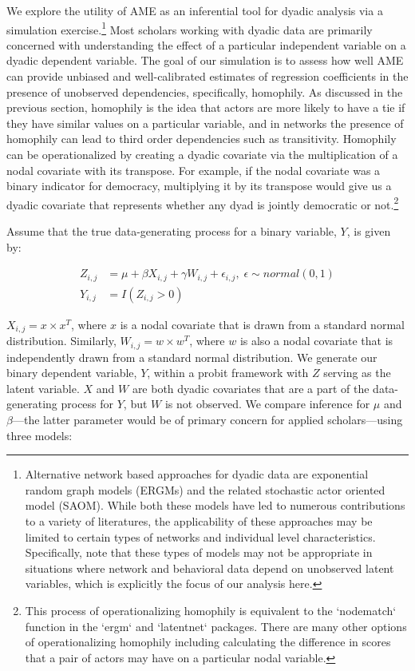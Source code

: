 \documentclass[12pt]{amsart}
\begin{document}
We explore the utility of AME as an inferential tool for dyadic analysis via a simulation exercise.\footnote{Alternative network based approaches for dyadic data are exponential random graph models (ERGMs) and the related stochastic actor oriented model (SAOM). While both these models have led to numerous contributions to a variety of literatures, the applicability of these approaches may be limited to certain types of networks and individual level characteristics. Specifically, \citet{block:etal:2017} note that these types of  models may not be appropriate in situations where network and behavioral data depend on unobserved latent variables, which is explicitly the focus of our analysis here.} Most scholars working with dyadic data are primarily concerned with understanding the effect of a particular independent variable on a dyadic dependent variable. The goal of our simulation is to assess how well AME can provide unbiased and well-calibrated estimates of regression coefficients in the presence of unobserved dependencies, specifically, homophily. As discussed in the previous section, homophily is the idea that actors are more likely to have a tie if they have similar values on a particular variable, and in networks the presence of homophily can lead to third order dependencies such as transitivity. Homophily can be operationalized by creating a dyadic covariate via the multiplication of a nodal covariate with its transpose. For example, if the nodal covariate was a binary indicator for democracy, multiplying it by its transpose would give us a dyadic covariate that represents whether any dyad is jointly democratic or not.\footnote{This process of operationalizing homophily is equivalent to the `nodematch` function in the `ergm` and `latentnet` packages. There are many other options of operationalizing homophily including calculating the difference in scores that a pair of actors may have on a particular nodal variable.}

Assume that the true data-generating process for a binary variable, $Y$, is given by:

\begin{align}
	Z_{i,j} &=  \mu + \beta X_{i,j} + \gamma W_{i,j} + \epsilon_{i,j}, \; \epsilon \sim normal(0,1) \nonumber \\
	Y_{i,j} &= I(Z_{i,j} > 0)
	\label{eqn:sim}
\end{align}

$X_{i,j} = x \times x^{T}$, where $x$ is a nodal covariate that is drawn from a standard normal distribution. Similarly,  $W_{i,j} = w \times w^{T}$, where $w$ is also a nodal covariate that is independently drawn from a standard normal distribution. We generate our binary dependent variable, $Y$, within a probit framework with $Z$ serving as the latent variable. $X$ and $W$ are both dyadic covariates that are a part of the data-generating process for $Y$, but $W$ is not observed. We compare inference for $\mu$ and $\beta$---the latter parameter would be of primary concern for applied scholars---using three models:
\end{document}
